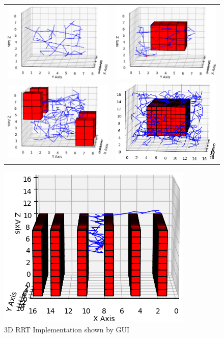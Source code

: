 

\begin{figure}[H]
\begin{center}
    \begin{tabular}{c  c}
    \includegraphics[width=0.45\linewidth]{chapters/chapter2/img/rrt_3d_1.png} & \includegraphics[width=0.45\linewidth]{chapters/chapter2/img/rrt_3d_2.png} \\
    \includegraphics[width=0.45\linewidth]{chapters/chapter2/img/rrt_3d_3.png} & \includegraphics[width=0.45\linewidth]{chapters/chapter2/img/rrt_3d_4.png}
    \end{tabular}
    \includegraphics[width=0.45\linewidth]{chapters/chapter2/img/rrt_3d_5.png}
    \caption{3D RRT Implementation shown by \ac{GUI}}
    \label{figure:3DrrtGui}
\end{center}
\end{figure}